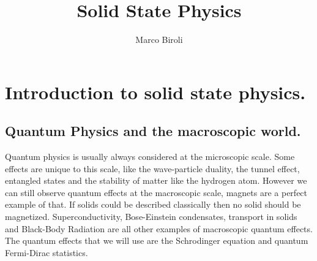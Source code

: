 \documentclass[10pt,a4paper]{book}
\author{Marco Biroli}
\title{Solid State Physics}
\begin{document}
\maketitle
\chapter{Introduction to solid state physics.}
\section{Quantum Physics and the macroscopic world.}
Quantum physics is usually always considered at the microscopic scale. Some effects are unique to this scale, like the wave-particle duality, the tunnel effect, entangled states and the stability of matter like the hydrogen atom. However we can still observe quantum effects at the macroscopic scale, magnets are a perfect example of that. If solids could be described classically then no solid should be magnetized. Superconductivity, Bose-Einstein condensates, transport in solids and Black-Body Radiation are all other examples of macroscopic quantum effects. The quantum effects that we will use are the Schrodinger equation and quantum Fermi-Dirac statistics.
\end{document}
